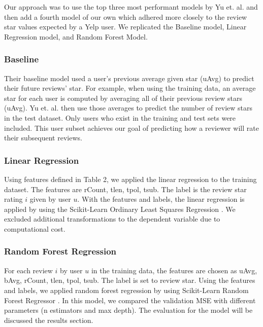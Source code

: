 \documentclass[12pt]{article}
\begin{document}
Our approach was to use the top three most performant models by Yu et. al. \cite{yu2015restaurants}
and then add a fourth model of our own which adhered more closely to the review star values
expected by a Yelp user. We replicated the Baseline model, Linear Regression model, and
Random Forest Model.

\subsubsection{Baseline}

Their baseline model used a user's previous average given star (uAvg) to predict their future
reviews' star. For example, when using the training data, an average star for each user
is computed by averaging all of their previous review stars (uAvg). Yu et. al.
\cite{yu2015restaurants} then use those averages to predict the number of review stars in the
test dataset. Only users who exist in the training and test sets were included. This user subset
achieves our goal of predicting how a reviewer will rate their subsequent reviews.

\subsubsection{Linear Regression}

Using features defined in Table 2, we applied the linear regression to the training dataset. The
features are rCount, tlen, tpol, tsub. The label is the review star rating $i$ given by
user $u$. With the features and labels, the linear regression is applied by using
the Scikit-Learn Ordinary Least Squares Regression \cite{sklearnl76:online}. We excluded
additional transformations to the dependent variable due to computational cost.

\subsubsection{Random Forest Regression}

For each review $i$ by user $u$ in the training data, the features are chosen as uAvg, bAvg,
rCount, tlen, tpol, tsub. The label is set to review star. Using the features and labels,
we applied random forest regression by using Scikit-Learn Random Forest Regressor
\cite{32432skl20:online}. In this model, we compared the validation MSE with different
parameters (n estimators and max depth). The evaluation for the model will be discussed the
results section.
\end{document}
